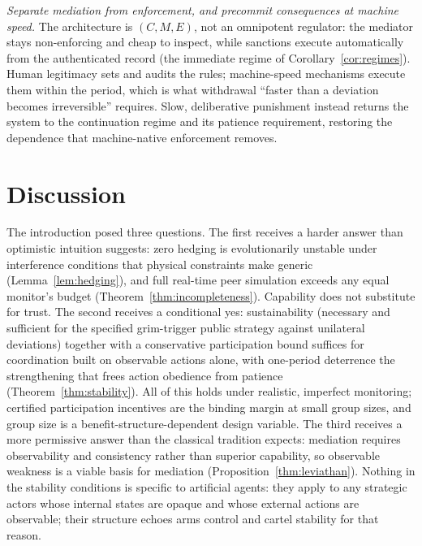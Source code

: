 \documentclass[manuscript,screen,review]{jair}
\begin{document}
\emph{Separate mediation from enforcement, and precommit consequences at machine speed.} The architecture is $(C, M, E)$, not an omnipotent regulator: the mediator stays non-enforcing and cheap to inspect, while sanctions execute automatically from the authenticated record (the immediate regime of Corollary~\ref{cor:regimes}). Human legitimacy sets and audits the rules; machine-speed mechanisms execute them within the period, which is what withdrawal ``faster than a deviation becomes irreversible'' requires. Slow, deliberative punishment instead returns the system to the continuation regime and its patience requirement, restoring the dependence that machine-native enforcement removes.

\section{Discussion}
\label{sec:discussion}

The introduction posed three questions. The first receives a harder answer than optimistic intuition suggests: zero hedging is evolutionarily unstable under interference conditions that physical constraints make generic (Lemma~\ref{lem:hedging}), and full real-time peer simulation exceeds any equal monitor's budget (Theorem~\ref{thm:incompleteness}). Capability does not substitute for trust. The second receives a conditional yes: sustainability (necessary and sufficient for the specified grim-trigger public strategy against unilateral deviations) together with a conservative participation bound suffices for coordination built on observable actions alone, with one-period deterrence the strengthening that frees action obedience from patience (Theorem~\ref{thm:stability}). All of this holds under realistic, imperfect monitoring; certified participation incentives are the binding margin at small group sizes, and group size is a benefit-structure-dependent design variable. The third receives a more permissive answer than the classical tradition expects: mediation requires observability and consistency rather than superior capability, so observable weakness is a viable basis for mediation (Proposition~\ref{thm:leviathan}). Nothing in the stability conditions is specific to artificial agents: they apply to any strategic actors whose internal states are opaque and whose external actions are observable; their structure echoes arms control and cartel stability for that reason.
\end{document}
